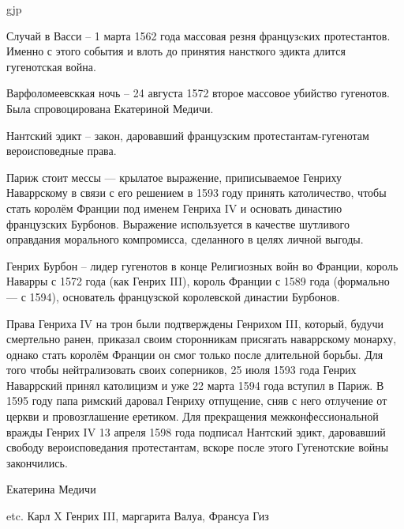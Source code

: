 gjp	 \documentclass[12pt,a4paper]{article}
\begin{document}
Случай в Васси -- 1 марта 1562 года массовая резня французcких протестантов. Именно с этого события и влоть до принятия нансткого эдикта длится гугенотская война.

Варфоломеевсккая ночь -- 24 августа 1572 второе массовое убийство гугенотов. Была спровоцирована Екатериной Медичи.

Нантский эдикт -- закон, даровавший французским протестантам-гугенотам вероисповедные права. 

Париж стоит мессы — крылатое выражение, приписываемое Генриху Наваррскому в связи с его решением в 1593 году принять католичество, чтобы стать королём Франции под именем Генриха IV и основать династию французских Бурбонов. Выражение используется в качестве шутливого оправдания морального компромисса, сделанного в целях личной выгоды.

Генрих Бурбон -- лидер гугенотов в конце Религиозных войн во Франции, король Наварры с 1572 года (как Генрих III), король Франции с 1589 года (формально — с 1594), основатель французской королевской династии Бурбонов.

Права Генриха IV на трон были подтверждены Генрихом III, который, будучи смертельно ранен, приказал своим сторонникам присягать наваррскому монарху, однако стать королём Франции он смог только после длительной борьбы. Для того чтобы нейтрализовать своих соперников, 25 июля 1593 года Генрих Наваррский принял католицизм и уже 22 марта 1594 года вступил в Париж. В 1595 году папа римский даровал Генриху отпущение, сняв с него отлучение от церкви и провозглашение еретиком. Для прекращения межконфессиональной вражды Генрих IV 13 апреля 1598 года подписал Нантский эдикт, даровавший свободу вероисповедания протестантам, вскоре после этого Гугенотские войны закончились.

Екатерина Медичи

etc. Карл X Генрих III, маргарита Валуа, Франсуа Гиз

\end{document}
